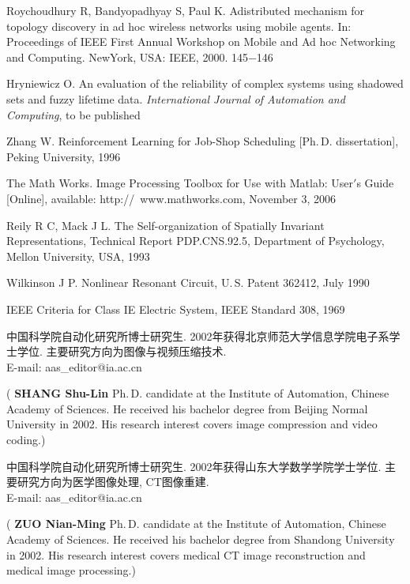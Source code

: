 \documentclass{aas}
\begin{document}
\begin{multicols}{2}
\begin{thebibliography}{99}
 Roychoudhury R, Bandyopadhyay S, Paul K. Adistributed mechanism
for topology discovery in ad hoc wireless networks using mobile
agents. In: Proceedings of IEEE First Annual Workshop on Mobile and
Ad hoc Networking and Computing. NewYork, USA: IEEE, 2000. 145$-$146

 Hryniewicz O. An evaluation of the reliability of complex
systems using shadowed sets and fuzzy lifetime data. {\sl
International Journal of Automation and Computing}, to be published

 Zhang W. Reinforcement Learning for Job-Shop Scheduling [Ph.\,D.
dissertation], Peking University, 1996

 The Math Works. Image Processing Toolbox for Use with Matlab: User$'$s
Guide [Online], available: http://~www.mathworks.com, November 3,
2006

 Reily R C, Mack J L. The Self-organization of Spatially Invariant
Representations, Technical Report PDP.CNS.92.5, Department of
Psychology, Mellon University, USA, 1993

 Wilkinson J P. Nonlinear Resonant Circuit, U.\,S. Patent 362412, July 1990

 IEEE Criteria for Class IE Electric System, IEEE Standard 308, 1969
\end{thebibliography}

\begin{biography}
\quad
中国科学院自动化研究所博士研究生.
2002年获得北京师范大学信息学院电子系学士学位.
主要研究方向为图像与视频压缩技术.\\E-mail: aas\_editor@ia.ac.cn

\noindent({\bf
SHANG Shu-Lin
}\quad
Ph.\,D. candidate at the
Institute of Automation, Chinese Academy of Sciences. He received
his bachelor degree from Beijing Normal University in 2002. His research
interest covers image compression and video coding.)
\end{biography}

\begin{biography}
\quad
中国科学院自动化研究所博士研究生.
2002年获得山东大学数学学院学士学位.
主要研究方向为医学图像处理, CT图像重建.\\E-mail: aas\_editor@ia.ac.cn

\noindent({\bf
ZUO Nian-Ming
}\quad
Ph.\,D. candidate at the
Institute of Automation, Chinese Academy of Sciences. He received
his bachelor degree from Shandong University in 2002. His research
interest covers medical CT image reconstruction and medical image
processing.)
\end{biography}


\end{multicols}
\end{document}
